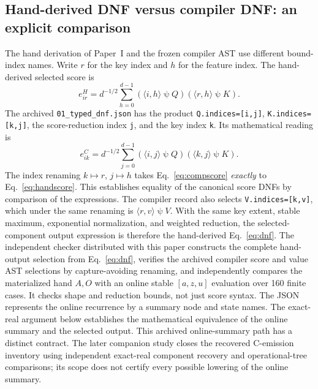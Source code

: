 \documentclass[sigplan,10pt,review,anonymous,balance=false,pbalance=false]{acmart}
\newcommand{\ps}{\mathbin{\psi}}
\begin{document}
\subsection{Hand-derived DNF versus compiler DNF: an explicit comparison}
The hand derivation of Paper~I and the frozen compiler AST use different bound-index names. Write $r$ for the key index and $h$ for the feature index. The hand-derived selected score is
\begin{equation}
 e_{ir}^{H}=d^{-1/2}\sum_{h=0}^{d-1}(\langle i,h\rangle\ps Q)(\langle r,h\rangle\ps K).
 \label{eq:handscore}
\end{equation}
The archived \texttt{01\_typed\_dnf.json} has the product \texttt{Q.indices=[i,j]}, \texttt{K.indices=[k,j]}, the score-reduction index \texttt{j}, and the key index \texttt{k}. Its mathematical reading is
\begin{equation}
 e_{ik}^{C}=d^{-1/2}\sum_{j=0}^{d-1}(\langle i,j\rangle\ps Q)(\langle k,j\rangle\ps K).
 \label{eq:compscore}
\end{equation}
The index renaming $k\mapsto r$, $j\mapsto h$ takes Eq.~\eqref{eq:compscore} \emph{exactly} to Eq.~\eqref{eq:handscore}. This establishes equality of the canonical score DNFs by comparison of the expressions. The compiler record also selects \texttt{V.indices=[k,v]}, which under the same renaming is $\langle r,v\rangle\ps V$. With the same key extent, stable maximum, exponential normalization, and weighted reduction, the selected-component output expression is therefore the hand-derived Eq.~\eqref{eq:dnf}. The independent checker distributed with this paper constructs the complete hand-output selection from Eq.~\eqref{eq:dnf}, verifies the archived compiler score and value AST selections by capture-avoiding renaming, and independently compares the materialized hand $A,O$ with an online stable $[a,z,u]$ evaluation over 160 finite cases. It checks shape and reduction bounds, not just score syntax. The JSON represents the online recurrence by a summary node and state names. The exact-real argument below establishes the mathematical equivalence of the online summary and the selected output. This archived online-summary path has a distinct contract. The later companion study closes the recovered C-emission inventory using independent exact-real component recovery and operational-tree comparisons; its scope does not certify every possible lowering of the online summary.
\end{document}
